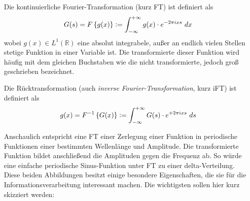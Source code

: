 
Die kontinuierliche Fourier-Transformation (kurz FT) ist definiert als
\begin{equation}
	G(s) = F\left\{g(x)\right\}\vcentcolon=\int_{-\infty}^{+\infty} g(x) \cdot e^{-2\pi i x s} ~dx
	\label{eq:ft}
\end{equation}
wobei $g(x)\in L^1(\mathbb{R})$ eine absolut integrabele, außer an endlich vielen Stellen stetige Funktion in einer Variable ist. Die transformierte dieser Funktion wird häufig mit dem gleichen Buchstaben wie die nicht transformierte, jedoch groß geschrieben bezeichnet.

Die Rücktransformation (auch \textit{inverse Fourier-Transformation}, kurz iFT) ist definiert als
\begin{equation}
	g(x) = F^{-1}\left\{G(x)\right\}\vcentcolon=\int_{-\infty}^{+\infty} G(s) \cdot e^{+2\pi i x s} ~ds
	\label{eq:ift}
\end{equation}

Anschaulich entspricht eine FT einer Zerlegung einer Funktion in periodische Funktionen einer bestimmten Wellenlänge und Amplitude. Die transformierte Funktion bildet anschließend die Amplituden gegen die Frequenz ab. So würde eine einfache periodische Sinus-Funktion unter FT zu einer delta-Verteilung.\\

Diese beiden Abbildungen besitzt einige besondere Eigenschaften, die sie für die Informationsverarbeitung interessant machen. Die wichtigsten sollen hier kurz skizziert werden:

